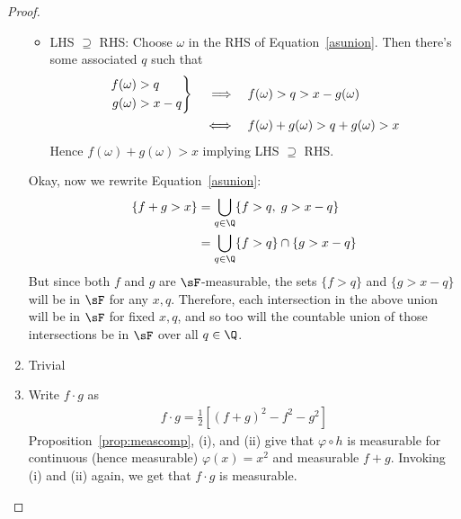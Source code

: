 \documentclass[12pt]{article}
\theoremstyle{plain}
\theoremstyle{definition}
\theoremstyle{remark}
\newenvironment{rcases}
  {\left.\begin{aligned}}
  {\end{aligned}\right\rbrace}
\begin{document}
\begin{proof}
\begin{enumerate}[label=(\roman*)]
\begin{itemize}
      \item LHS $\supseteq$ RHS:
        Choose $\omega$ in the RHS of Equation~\ref{asunion}. Then
        there's some associated $q$ such that
        \begin{align*}
          \begin{rcases}
          f(\omega) &> q \\
          g(\omega) &> x-q
          \end{rcases}
          \quad\implies\quad&
          f(\omega) > q > x-g(\omega) \\
          \quad\iff\quad&
          f(\omega) + g(\omega) > q + g(\omega)> x
        \end{align*}
        Hence $f(\omega)+g(\omega) > x$ implying LHS $\supseteq$ RHS.
    \end{itemize}
    Okay, now we rewrite Equation~\ref{asunion}:
    \begin{align*}
      \{f+g> x\}
      &=
      \bigcup_{q\in \Q}
      \{
        f > q,\;
        g > x-q
      \} \\
      &=
      \bigcup_{q\in \Q}
      \{ f > q\}
      \cap
      \{ g > x-q \}
    \end{align*}
    But since both $f$ and $g$ are $\sF$-measurable, the sets $\{f>q\}$
    and $\{g>x-q\}$ will be in $\sF$ for any $x,q$. Therefore, each
    intersection in the above union will be in $\sF$ for fixed $x,q$,
    and so too will the countable union of those intersections be in
    $\sF$ over all $q\in\Q$.

  \item Trivial
  \item Write $f\cdot g$ as
    \begin{align*}
      f\cdot g
      =
      \frac{1}{2}
      \left[
      (f+g)^2 - f^2 - g^2
      \right]
    \end{align*}
    Proposition~\ref{prop:meascomp}, (i), and (ii) give that
    $\varphi\circ h$ is measurable for continuous (hence measurable)
    $\varphi(x)=x^2$ and measurable $f+g$. Invoking (i) and (ii) again,
    we get that $f\cdot g$ is measurable.
\end{enumerate}
\end{proof}
\end{document}
